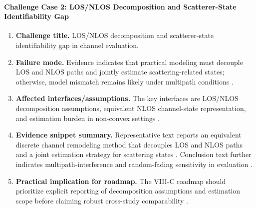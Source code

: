 \documentclass[lettersize,journal]{IEEEtran}
\begin{document}
\paragraph{Challenge Case 2: LOS/NLOS Decomposition and Scatterer-State Identifiability Gap}
\begin{enumerate}
    \item \textbf{Challenge title.} LOS/NLOS decomposition and scatterer-state identifiability gap in channel evaluation.
    \item \textbf{Failure mode.} Evidence indicates that practical modeling must decouple LOS and NLOS paths and jointly estimate scattering-related states; otherwise, model mismatch remains likely under multipath conditions \cite{O_ISAC_050}.
    \item \textbf{Affected interfaces/assumptions.} The key interfaces are LOS/NLOS decomposition assumptions, equivalent NLOS channel-state representation, and estimation burden in non-convex settings \cite{O_ISAC_050}.
    \item \textbf{Evidence snippet summary.} Representative text reports an equivalent discrete channel remodeling method that decouples LOS and NLOS paths and a joint estimation strategy for scattering states \cite{O_ISAC_050}. Conclusion text further indicates multipath-interference and random-fading sensitivity in evaluation \cite{O_ISAC_050}.
    \item \textbf{Practical implication for roadmap.} The VIII-C roadmap should prioritize explicit reporting of decomposition assumptions and estimation scope before claiming robust cross-study comparability \cite{O_ISAC_050}.
\end{enumerate}
\end{document}
